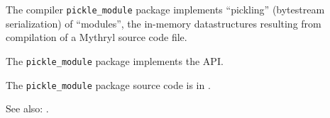 
The compiler {\tt pickle\_module} package implements ``pickling'' (bytestream serialization) 
of ``modules'', the in-memory datastructures resulting from compilation of a Mythryl source 
code file.

The {\tt pickle\_module} package implements the  API.

The {\tt pickle\_module} package source code is in .

See also: .
